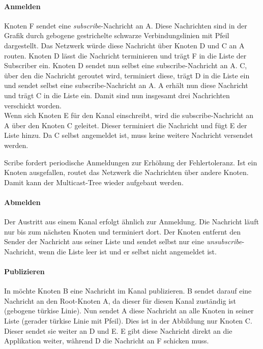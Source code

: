 \paragraph*{Anmelden}
Knoten F sendet eine \emph{subscribe}-Nachricht an A. Diese Nachrichten sind in der Grafik durch gebogene gestrichelte schwarze Verbindungslinien mit Pfeil dargestellt. Das Netzwerk würde diese Nachricht über Knoten D und C an A routen. Knoten D lässt die Nachricht terminieren und trägt F in die Liste der Subscriber ein. Knoten D sendet nun selbst eine subscribe-Nachricht an A. C, über den die Nachricht geroutet wird, terminiert diese, trägt D in die Liste ein und sendet selbst eine subscribe-Nachricht an A. A erhält nun diese Nachricht und trägt C in die Liste ein. Damit sind nun insgesamt drei Nachrichten verschickt worden.\\
Wenn sich Knoten E für den Kanal einschreibt, wird die subscribe-Nachricht an A über den Knoten C geleitet. Dieser terminiert die Nachricht und fügt E der Liste hinzu. Da C selbst angemeldet ist, muss keine weitere Nachricht versendet werden.

Scribe fordert periodische Anmeldungen zur Erhöhung der Fehlertoleranz. Ist ein Knoten ausgefallen, routet das Netzwerk die Nachrichten über andere Knoten. Damit kann der Multicast-Tree wieder aufgebaut werden.

\paragraph*{Abmelden}
Der Austritt aus einem Kanal erfolgt ähnlich zur Anmeldung. Die Nachricht läuft nur bis zum nächsten Knoten und terminiert dort. Der Knoten entfernt den Sender der Nachricht aus seiner Liste und sendet selbst nur eine \emph{unsubscribe}-Nachricht, wenn die Liste leer ist und er selbst nicht angemeldet ist.

\paragraph*{Publizieren}
In  möchte Knoten B eine Nachricht im Kanal publizieren. B sendet darauf eine Nachricht an den Root-Knoten A, da dieser für diesen Kanal zuständig ist (gebogene türkise Linie). Nun sendet A diese Nachricht an alle Knoten in seiner Liste (gerader türkise Linie mit Pfeil). Dies ist in der Abbildung nur Knoten C. Dieser sendet sie weiter an D und E. E gibt diese Nachricht direkt an die Applikation weiter, während D die Nachricht an F schicken muss.


